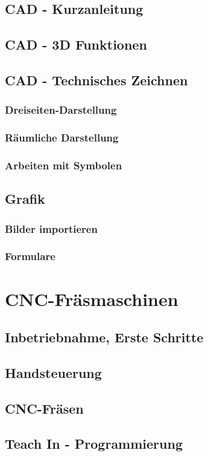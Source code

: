 \documentclass[a5paper]{book}
\begin{document}
	\section{CAD - Kurzanleitung}
	\section{CAD - 3D Funktionen}
	\section{CAD - Technisches Zeichnen}
		\subsection{Dreiseiten-Darstellung}
		\subsection{Räumliche Darstellung}
		\subsection{Arbeiten mit Symbolen}
	\section{Grafik}
		\subsection{Bilder importieren}
		\subsection{Formulare}
	 
\chapter{CNC-Fräsmaschinen} 
	\section{Inbetriebnahme, Erste Schritte}
	\section{Handsteuerung}
	\section{CNC-Fräsen}
	\section{Teach In - Programmierung} 
\end{document}
